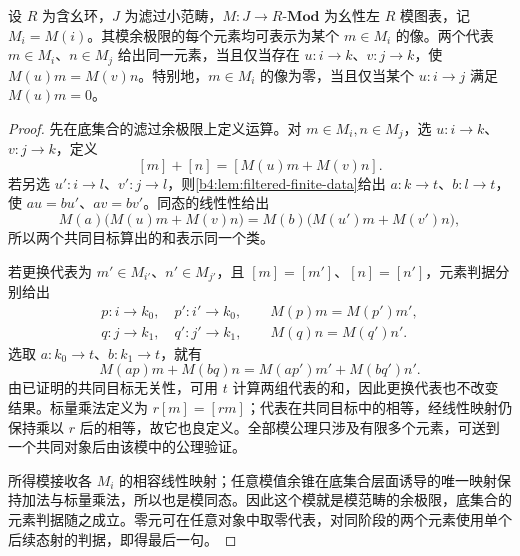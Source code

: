 \begin{proposition}[滤过模图表的单阶段表示]\label{b4:prop:filtered-module-elements}
	设 \(R\) 为含幺环，\(J\) 为滤过小范畴，\(M:J\rightarrow R\text{-}\mathbf{Mod}\) 为幺性左 \(R\) 模图表，记 \(M_i=M(i)\)。其模余极限的每个元素均可表示为某个 \(m\in M_i\) 的像。两个代表 \(m\in M_i\)、\(n\in M_j\) 给出同一元素，当且仅当存在 \(u:i\rightarrow k\)、\(v:j\rightarrow k\)，使 \(M(u)m=M(v)n\)。特别地，\(m\in M_i\) 的像为零，当且仅当某个 \(u:i\rightarrow j\) 满足 \(M(u)m=0\)。
\end{proposition}
\begin{proof}
	先在底集合的滤过余极限上定义运算。对 \(m\in M_i,n\in M_j\)，选 \(u:i\rightarrow k\)、\(v:j\rightarrow k\)，定义
	\[
		[m]+[n]=[M(u)m+M(v)n].
	\]
	若另选 \(u':i\rightarrow l\)、\(v':j\rightarrow l\)，则\cref{b4:lem:filtered-finite-data}给出 \(a:k\rightarrow t\)、\(b:l\rightarrow t\)，使 \(au=bu'\)、\(av=bv'\)。同态的线性性给出
	\[
		M(a)\bigl(M(u)m+M(v)n\bigr) =M(b)\bigl(M(u')m+M(v')n\bigr),
	\]
	所以两个共同目标算出的和表示同一个类。

	若更换代表为 \(m'\in M_{i'}\)、\(n'\in M_{j'}\)，且 \([m]=[m']\)、\([n]=[n']\)，元素判据分别给出
	\[
		\begin{gathered}
			p:i\rightarrow k_0,\quad p':i'\rightarrow k_0,\qquad M(p)m=M(p')m',\\
			q:j\rightarrow k_1,\quad q':j'\rightarrow k_1,\qquad M(q)n=M(q')n'.
		\end{gathered}
	\]
	选取 \(a:k_0\rightarrow t\)、\(b:k_1\rightarrow t\)，就有
	\[
		M(ap)m+M(bq)n=M(ap')m'+M(bq')n'.
	\]
	由已证明的共同目标无关性，可用 \(t\) 计算两组代表的和，因此更换代表也不改变结果。标量乘法定义为 \(r[m]=[rm]\)；代表在共同目标中的相等，经线性映射仍保持乘以 \(r\) 后的相等，故它也良定义。全部模公理只涉及有限多个元素，可送到一个共同对象后由该模中的公理验证。

	所得模接收各 \(M_i\) 的相容线性映射；任意模值余锥在底集合层面诱导的唯一映射保持加法与标量乘法，所以也是模同态。因此这个模就是模范畴的余极限，底集合的元素判据随之成立。零元可在任意对象中取零代表，对同阶段的两个元素使用单个后续态射的判据，即得最后一句。
\end{proof}

